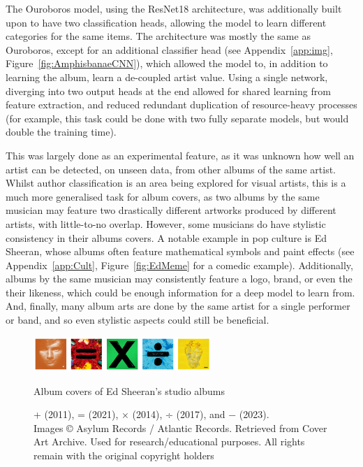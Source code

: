                 The Ouroboros model, using the ResNet18 architecture, was additionally built upon to have two classification heads, allowing the model to learn different categories for the same items. The architecture was mostly the same as Ouroboros, except for an additional classifier head (see Appendix~\ref{app:img}, Figure~\ref{fig:AmphisbanaeCNN}), which allowed the model to, in addition to learning the album, learn a de-coupled artist value. Using a single network, diverging into two output heads at the end allowed for shared learning from feature extraction, and reduced redundant duplication of resource-heavy processes (for example, this task could be done with two fully separate models, but would double the training time).
    
                This was largely done as an experimental feature, as it was unknown how well an artist can be detected, on unseen data, from other albums of the same artist. Whilst author classification is an area being explored for visual artists, this is a much more generalised task for album covers, as two albums by the same musician may feature two drastically different artworks produced by different artists, with little-to-no overlap. However, some musicians do have stylistic consistency in their albums covers. A notable example in pop culture is Ed Sheeran, whose albums often feature mathematical symbols and paint effects (see Appendix~\ref{app:Cult}, Figure~\ref{fig:EdMeme} for a comedic example). Additionally, albums by the same musician may consistently feature a logo, brand, or even the their likeness, which could be enough information for a deep model to learn from. And, finally, many album arts are done by the same artist for a single performer or band, and so even stylistic aspects could still be beneficial.
    
                \begin{figure}[h]
                    \centering
                    \includegraphics[width=0.6\textwidth]{images/EdAlbums.png}
                    \caption{Album covers of Ed Sheeran’s studio albums}
                    \label{fig:EdAlbums}
                    \caption*{+ (2011), = (2021), × (2014), ÷ (2017), and − (2023). \\ Images © Asylum Records / Atlantic Records. Retrieved from Cover Art Archive. Used for research/educational purposes. All rights remain with the original copyright holders}
                \end{figure}
    
